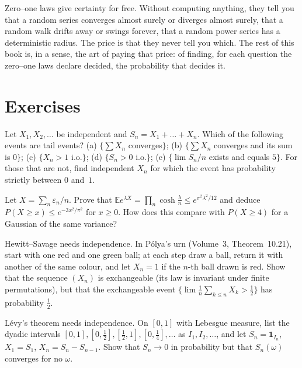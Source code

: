 \begin{beauty}
Zero--one laws give certainty for free. Without computing anything, they tell you that a random series converges almost surely or
diverges almost surely, that a random walk drifts away or swings forever, that a random power series has a deterministic radius.
The price is that they never tell you which. The rest of this book is, in a sense, the art of paying that price: of finding, for each
question the zero--one laws declare decided, the probability that decides it.
\end{beauty}

\section{Exercises}

\begin{exercise}[$\star$]\label{ex:tailevents}
Let $X_1,X_2,\dots$ be independent and $S_n=X_1+\dots+X_n$. Which of the following events are tail events? (a) $\{\sum X_n$ converges$\}$;
(b) $\{\sum X_n$ converges and its sum is $0\}$; (c) $\{X_n>1$ i.o.$\}$; (d) $\{S_n>0$ i.o.$\}$; (e) $\{\lim S_n/n$ exists and equals $5\}$.
For those that are not, find independent $X_n$ for which the event has probability strictly between $0$ and~$1$.
\end{exercise}

\begin{exercise}[$\star$]\label{ex:subgauss}
Let $X=\sum_n\varepsilon_n/n$. Prove that $\mathbb E e^{\lambda X}=\prod_n\cosh\frac\lambda n\le e^{\pi^2\lambda^2/12}$ and deduce
$P(X\ge x)\le e^{-3x^2/\pi^2}$ for $x\ge0$. How does this compare with $P(X\ge4)$ for a Gaussian of the same variance?
\end{exercise}

\begin{exercise}[$\star$]\label{ex:polya}
Hewitt--Savage needs independence. In P\'olya's urn (Volume~3, Theorem~10.21), start with one red and one green ball; at each step draw
a ball, return it with another of the same colour, and let $X_n=1$ if the $n$-th ball drawn is red. Show that the sequence $(X_n)$ is
exchangeable (its law is invariant under finite permutations), but that the exchangeable event $\{\lim\frac1n\sum_{k\le n}X_k>\frac12\}$
has probability $\frac12$.
\end{exercise}

\begin{exercise}[$\star\star$]\label{ex:levyindep}
L\'evy's theorem needs independence. On $[0,1]$ with Lebesgue measure, list the dyadic intervals $[0,1],[0,\frac12],[\frac12,1],
[0,\frac14],\dots$ as $I_1,I_2,\dots$, and let $S_n=\mathbf 1_{I_n}$, $X_1=S_1$, $X_n=S_n-S_{n-1}$. Show that $S_n\to0$ in probability but
that $S_n(\omega)$ converges for no $\omega$.
\end{exercise}

